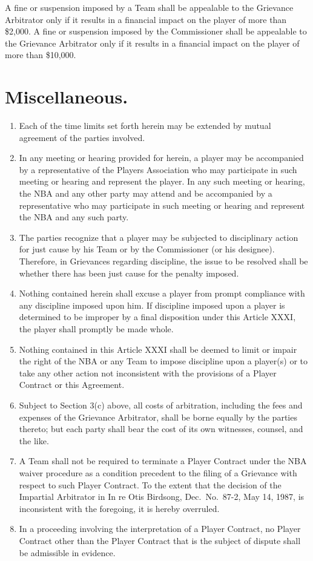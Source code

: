 \documentclass[
]{book}
\providecommand{\tightlist}{%
  \setlength{\itemsep}{0pt}\setlength{\parskip}{0pt}}
\begin{document}
A fine or suspension imposed by a Team shall be appealable to the Grievance Arbitrator only if it results in a financial impact on the player of more than \$2,000. A fine or suspension imposed by the Commissioner shall be appealable to the Grievance Arbitrator only if it results in a financial impact on the player of more than \$10,000.

\hypertarget{miscellaneous.}{%
\section{Miscellaneous.}\label{miscellaneous.}}

\begin{enumerate}
\def\labelenumi{(\alph{enumi})}
\tightlist
\item
  Each of the time limits set forth herein may be extended by mutual agreement of the parties involved.
\item
  In any meeting or hearing provided for herein, a player may be accompanied by a representative of the Players Association who may participate in such meeting or hearing and represent the player. In any such meeting or hearing, the NBA and any other party may attend and be accompanied by a representative who may participate in such meeting or hearing and represent the NBA and any such party.
\item
  The parties recognize that a player may be subjected to disciplinary action for just cause by his Team or by the Commissioner (or his designee). Therefore, in Grievances regarding discipline, the issue to be resolved shall be whether there has been just cause for the penalty imposed.
\item
  Nothing contained herein shall excuse a player from prompt compliance with any discipline imposed upon him. If discipline imposed upon a player is determined to be improper by a final disposition under this Article XXXI, the player shall promptly be made whole.
\item
  Nothing contained in this Article XXXI shall be deemed to limit or impair the right of the NBA or any Team to impose discipline upon a player(s) or to take any other action not inconsistent with the provisions of a Player Contract or this Agreement.
\item
  Subject to Section 3(c) above, all costs of arbitration, including the fees and expenses of the Grievance Arbitrator, shall be borne equally by the parties thereto; but each party shall bear the cost of its own witnesses, counsel, and the like.
\item
  A Team shall not be required to terminate a Player Contract under the NBA waiver procedure as a condition precedent to the filing of a Grievance with respect to such Player Contract. To the extent that the decision of the Impartial Arbitrator in In re Otis Birdsong, Dec.~No.~87-2, May 14, 1987, is inconsistent with the foregoing, it is hereby overruled.
\item
  In a proceeding involving the interpretation of a Player Contract, no Player Contract other than the Player Contract that is the subject of dispute shall be admissible in evidence.
\end{enumerate}
\end{document}
